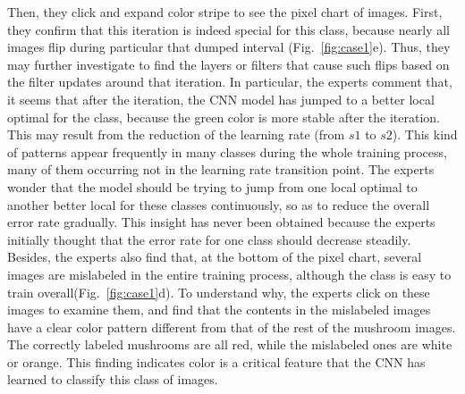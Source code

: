 \documentclass[format=acmsmall, review=false, screen=true]{acmart}
\newcommand{\dy}{\textcolor[rgb]{0,0,0}}
\begin{document}
Then, they click and expand color stripe to see the pixel chart of images.
First, they confirm that this iteration is indeed special for this class, because nearly all images flip during particular that \dy{dumped interval} (Fig.~\ref{fig:case1}e).
Thus, they may further investigate to find the layers or filters that cause such flips based on the filter updates around that iteration.
\dy{In particular, the experts comment that, it seems that after the iteration, the CNN model has jumped to a better local optimal for the class, because the green color is more stable after the iteration.
This may result from the reduction of the learning rate (from $s1$ to $s2$).
This kind of patterns appear frequently in many classes during the whole training process, many of them occurring not in the learning rate transition point.
The experts wonder that the model should be trying to jump from one local optimal to another better local for these classes continuously, so as to reduce the overall error rate gradually.}
This insight has never been obtained because the experts initially thought that the error rate for one class should decrease steadily.
Besides, the experts also find that, at the bottom of the pixel chart, several images are mislabeled in the entire training process, although the class is easy to train overall(Fig.~\ref{fig:case1}d).
To understand why, the experts click on these images to examine them, and find that the contents in the mislabeled images have a clear color pattern different from that of the rest of the mushroom images.
The correctly labeled mushrooms are all red, while the mislabeled ones are white or orange.
This finding indicates color is a critical feature that the CNN has learned to classify this class of images.
\end{document}
